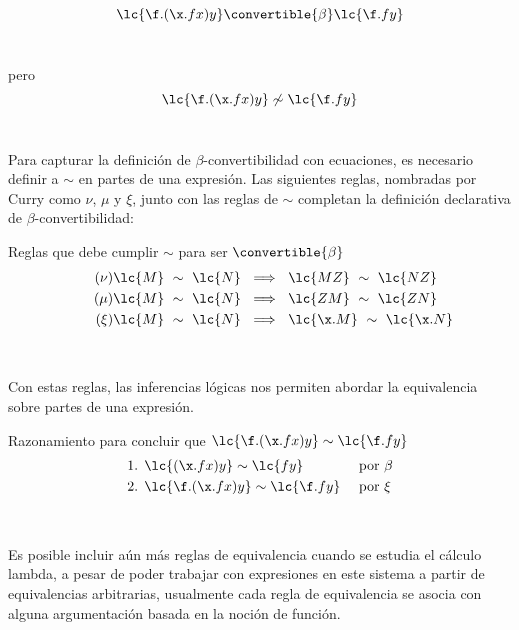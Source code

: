 \[\lc{\f.(\x.f x)y} \convertible{\beta} \lc{\f.f y}\] \

pero \\

\[\lc{\f.(\x.f x)y} \not\sim \lc{\f.f y}\] \

Para capturar la definición de \(\beta\)-convertibilidad con ecuaciones, es necesario definir a \(\sim\) en partes de una expresión. Las siguientes reglas, nombradas por Curry \cite[p.~59]{Curry:CombinatoryLogicI} como \(\nu\), \(\mu\) y \(\xi\), junto con las reglas de \(\sim\) completan la definición declarativa de \(\beta\)-convertibilidad: \\

\begin{defi} Reglas que debe cumplir \(\sim\) para ser \(\convertible{\beta}\)
  \label{definicion:2}
  \begin{subequations}
    \begin{align}
      \label{definicion:2:nu} \tag{\ensuremath{\nu}}
      \lc{M}\ \sim\ \lc{N}\ &\implies\ \lc{M Z}\ \sim\ \lc{N Z}
      \\
      \label{definicion:2:mu} \tag{\ensuremath{\mu}}
      \lc{M}\ \sim\ \lc{N}\ &\implies\ \lc{Z M}\ \sim\ \lc{Z N}
      \\
      \label{definicion:3:xi} \tag{\ensuremath{\xi}}
      \lc{M}\ \sim\ \lc{N}\ &\implies\ \lc{\x.M}\ \sim\ \lc{\x.N}
    \end{align}
  \end{subequations}
\end{defi} \

Con estas reglas, las inferencias lógicas nos permiten abordar la equivalencia sobre partes de una expresión. \\

\begin{ejemplo} Razonamiento para concluir que \(\lc{\f.(\x.f x)y} \sim \lc{\f.f y}\)
  \begin{align*}
    \text{1. } &\lc{(\x.f x)y} \sim \lc{f y} & &\text{ por \(\beta\)} \\
    \text{2. } &\lc{\f.(\x.f x)y} \sim \lc{\f.f y} & &\text{ por \(\xi\)}
  \end{align*}
\end{ejemplo} \

Es posible incluir aún más reglas de equivalencia cuando se estudia el cálculo lambda, a pesar de poder trabajar con expresiones en este sistema a partir de equivalencias arbitrarias, usualmente cada regla de equivalencia se asocia con alguna argumentación basada en la noción de función. \\

